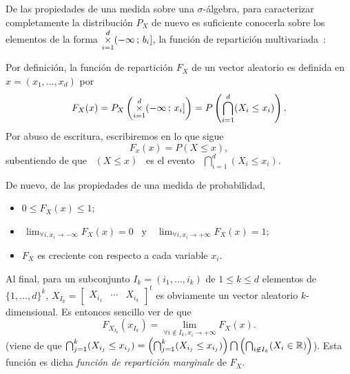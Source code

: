 De las propiedades de una medida sobre una $\sigma$-\'algebra, para caracterizar
completamente la distribuci\'on $P_X$ de nuevo es suficiente conocerla sobre los
elementos de  la forma $\displaystyle  \operatorname*{\times}_{i=1}^d (-\infty \, ;  \, b_i]$,
\ie  la funci\'on  de repartici\'on  multivariada~\cite{AthLah06,  Coh13, Bre88,
  HogMck13}:
%
\begin{definicion}
  Por  definici\'on,  la  funci\'on  de  repartici\'on  $F_X$  de  un vector
  aleatorio es definida en $x = (x_1 , \ldots , x_d)$ por
  \[
  F_X(x) =  P_X\left( \operatorname*{\times}_{i=1}^d (-\infty \,  ; \, x_i]  \right) = P\left(
    \bigcap_{i=1}^d (X_i \le x_i) \right).
  \]
  Por abuso de escritura, escribiremos en lo que sigue
  \[
  F_x(x) = P(X \le x),
  \]
  subentiendo  de  que   \  $(X  \le  x)$  \  es   el  evento  \  $\displaystyle
  \bigcap_{i=1}^d (X_i \le x_i)$.
\end{definicion}
%
De nuevo, de las propiedades de una medida de probabilidad,
%
\begin{itemize}
\item $0 \le F_X(x) \le 1$;
%
\item $\displaystyle  \, \lim_{\forall  i, x_i \to  -\infty} F_X(x)  = 0$ \  y \
  $\displaystyle \, \lim_{\forall i, x_i \to +\infty} F_X(x) = 1$;
%
\item $F_X$ es creciente con respecto a cada variable $x_i$.
\end{itemize}
%
Al  final, para  un subconjunto  $I_k =  (i_1,\ldots,i_k)$ de  $1 \le  k  \le d$
elementos de  $\{ 1  , \ldots ,  d \}^k$,  $X_{I_k} = \begin{bmatrix}  X_{i_1} &
  \cdots   &   X_{i_k}\end{bmatrix}^t$  es   obviamente   un  vector   aleatorio
$k$-dimensional. Es entonces sencillo ver de que
%
\[
F_{X_{I_k}}(x_{I_k}) = \lim_{\forall i \not\in I_k, x_i \to +\infty} F_X(x).
\label{Pagina:MP:MarginalesF}
\]
%
(viene de  que $\bigcap_{j=1}^k (X_{i_j}  \le x_{i_j}) =  \left( \bigcap_{j=1}^k
  (X_{i_j} \le x_{i_j}) \right) \bigcap  \left( \bigcap_{i \not\in I_k} (X_i \in
  \mathbb{R})  \right)$). Esta  funci\'on es  dicha {\it  funci\'on  de repartici\'on
  marginale} de $F_X$.

